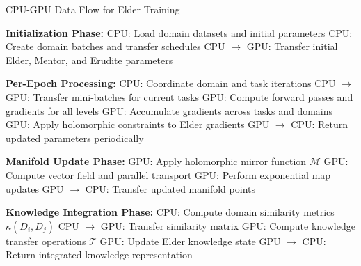 \begin{algorithm}
\caption{CPU-GPU Data Flow for Elder Training}
\begin{algorithmic}[1]
\State \textbf{Initialization Phase:}
\State \hspace{\algorithmicindent} CPU: Load domain datasets and initial parameters
\State \hspace{\algorithmicindent} CPU: Create domain batches and transfer schedules
\State \hspace{\algorithmicindent} CPU $\rightarrow$ GPU: Transfer initial Elder, Mentor, and Erudite parameters

\State \textbf{Per-Epoch Processing:}
\State \hspace{\algorithmicindent} CPU: Coordinate domain and task iterations
\State \hspace{\algorithmicindent} CPU $\rightarrow$ GPU: Transfer mini-batches for current tasks
\State \hspace{\algorithmicindent} GPU: Compute forward passes and gradients for all levels
\State \hspace{\algorithmicindent} GPU: Accumulate gradients across tasks and domains
\State \hspace{\algorithmicindent} GPU: Apply holomorphic constraints to Elder gradients
\State \hspace{\algorithmicindent} GPU $\rightarrow$ CPU: Return updated parameters periodically

\State \textbf{Manifold Update Phase:}
\State \hspace{\algorithmicindent} GPU: Apply holomorphic mirror function $\mathcal{M}$
\State \hspace{\algorithmicindent} GPU: Compute vector field and parallel transport
\State \hspace{\algorithmicindent} GPU: Perform exponential map updates
\State \hspace{\algorithmicindent} GPU $\rightarrow$ CPU: Transfer updated manifold points

\State \textbf{Knowledge Integration Phase:}
\State \hspace{\algorithmicindent} CPU: Compute domain similarity metrics $\kappa(D_i, D_j)$
\State \hspace{\algorithmicindent} CPU $\rightarrow$ GPU: Transfer similarity matrix
\State \hspace{\algorithmicindent} GPU: Compute knowledge transfer operations $\mathcal{T}$
\State \hspace{\algorithmicindent} GPU: Update Elder knowledge state
\State \hspace{\algorithmicindent} GPU $\rightarrow$ CPU: Return integrated knowledge representation
\end{algorithmic}
\end{algorithm}

